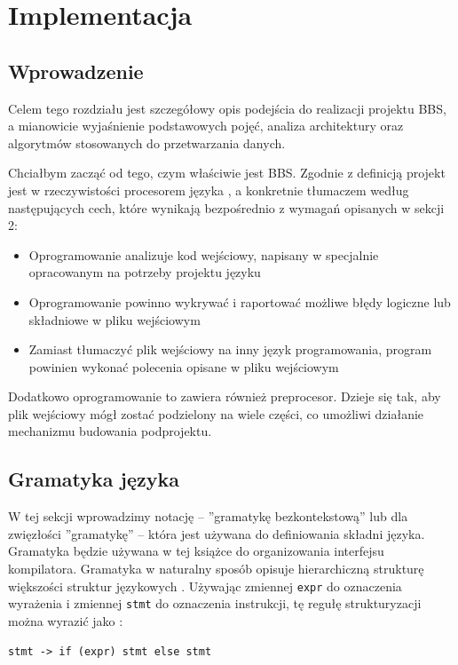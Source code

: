 \chapter{Implementacja}
\section{Wprowadzenie}
Celem tego rozdziału jest szczegółowy opis podejścia do realizacji projektu BBS, a mianowicie wyjaśnienie podstawowych pojęć, analiza architektury oraz algorytmów stosowanych do przetwarzania danych.

Chciałbym zacząć od tego, czym właściwie jest BBS. Zgodnie z definicją projekt jest w rzeczywistości procesorem języka \cite{compilers}, a konkretnie tłumaczem według następujących cech, które wynikają bezpośrednio z wymagań opisanych w sekcji 2:
\begin{itemize}
    \item Oprogramowanie analizuje kod wejściowy, napisany w specjalnie opracowanym na potrzeby projektu języku
    \item Oprogramowanie powinno wykrywać i raportować możliwe błędy logiczne lub składniowe w pliku wejściowym
    \item Zamiast tłumaczyć plik wejściowy na inny język programowania, program powinien wykonać polecenia opisane w pliku wejściowym
\end{itemize}

Dodatkowo oprogramowanie to zawiera również preprocesor. Dzieje się tak, aby plik wejściowy mógł zostać podzielony na wiele części, co umożliwi działanie mechanizmu budowania podprojektu.

\section{Gramatyka języka}

W tej sekcji wprowadzimy notację -- ''gramatykę bezkontekstową'' lub dla zwięzłości ''gramatykę'' -- która jest używana do definiowania składni języka. Gramatyka będzie używana w tej książce do organizowania interfejsu kompilatora. Gramatyka w naturalny sposób opisuje hierarchiczną strukturę większości struktur językowych \cite{compilers}. Używając zmiennej \texttt{expr} do oznaczenia wyrażenia i zmiennej \texttt{stmt} do oznaczenia instrukcji, tę regułę strukturyzacji można wyrazić jako :

\begin{lstlisting}[label=list:example_grammar,caption=Przykładowy opis gramatyki,basicstyle=\footnotesize\ttfamily]
stmt -> if (expr) stmt else stmt
\end{lstlisting}

